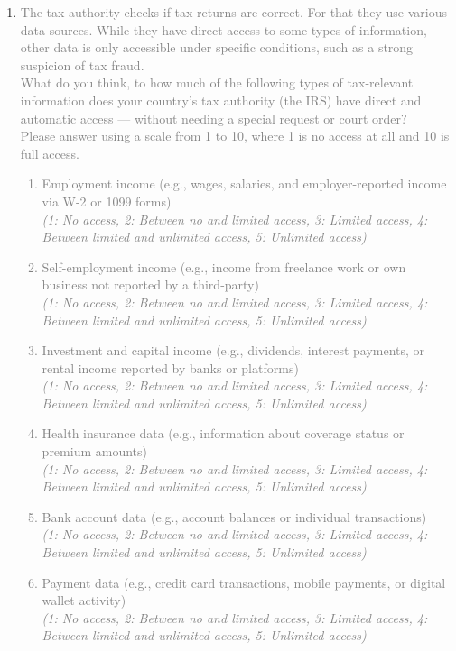 \documentclass[11pt]{article}
\begin{document}
\begin{enumerate}[resume]
    \item[\sout{\theenumi.}] \textcolor{gray}{The tax authority checks if tax returns are correct. For that they use various data sources. While they have direct access to some types of information, other data is only accessible under specific conditions, such as a strong suspicion of tax fraud.\\
    What do you think, to how much of the following types of tax-relevant information does your country’s tax authority (the IRS) have direct and automatic access — without needing a special request or court order? \\ 
    Please answer using a scale from 1 to 10, where 1 is no access at all and 10 is full access.}
    \textcolor{gray}{
    \begin{enumerate}[label=\alph*)]
        \item Employment income (e.g., wages, salaries, and employer-reported income via W-2 or 1099 forms) \\ \textit{(1: No access, 2: Between no and limited access, 3: Limited access, 4: Between limited and unlimited  access, 5: Unlimited access)} 
        \item Self-employment income (e.g., income from freelance work or own business not reported by a third-party) \\ \textit{(1: No access, 2: Between no and limited access, 3: Limited access, 4: Between limited and unlimited  access, 5: Unlimited access)} 
        \item Investment and capital income (e.g., dividends, interest payments, or rental income reported by banks or platforms) \\ \textit{(1: No access, 2: Between no and limited access, 3: Limited access, 4: Between limited and unlimited  access, 5: Unlimited access)}
        \item Health insurance data (e.g., information about coverage status or premium amounts) \\ \textit{(1: No access, 2: Between no and limited access, 3: Limited access, 4: Between limited and unlimited  access, 5: Unlimited access)}
        \item Bank account data (e.g., account balances or individual transactions) \\ \textit{(1: No access, 2: Between no and limited access, 3: Limited access, 4: Between limited and unlimited  access, 5: Unlimited access)}
        \item Payment data (e.g., credit card transactions, mobile payments, or digital wallet activity) \\ \textit{(1: No access, 2: Between no and limited access, 3: Limited access, 4: Between limited and unlimited  access, 5: Unlimited access)}
    \end{enumerate}}
\end{enumerate}
\end{document}
